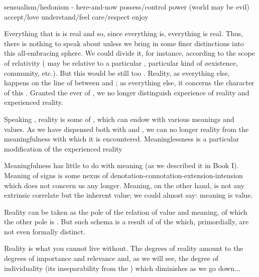 
    {sensualism/hedonism - here-and-now}
    {possess/control}
    {power (world may be evil)}
 {accept/love}
    {understand/feel}
    {care/respect}
    {enjoy}


Everything that is is real and so, since everything is, everything is real.
Thus, there is nothing to speak about unless we bring in some finer distinctions
into this all-embracing sphere. We could divide it, for instance, according to
the scope of relativity ( may be relative to a particular
, particular kind of \o{existence}, community, etc.). But this
would be still too . Reality, as everything else, happens on
the line of  between  and ; as
everything else, it concerns the character of this .
Granted the ever  of , 
 we no longer distinguish experience of reality and experienced reality.

Speaking , reality is some  of , which  can endow with various meanings and
values. As we have dispensed both with  and 
, we can no longer  reality from the meaningfulness
with which it is encountered. Meaninglessness is a particular modification of
the experienced reality

Meaningfulness has little to do with meaning (as
we described it in Book I). Meaning of signs is some nexus of
denotation-connotation-extension-intension which does not concern us any
longer. Meaning, on the other hand, is not any extrinsic correlate but the
inherent value; we could almost say: meaning is value.


Reality can be taken as the  pole of the relation of value and
meaning, of which the other pole is . But such schema is a result of
 of the  which, primordially, are not even
formally distinct. 

Reality is what you cannot live without. 
The degrees of reality amount to the degrees of importance and relevance and, as
we will see, the degree of individuality (its inseparability from the
) which diminishes as we go down...

